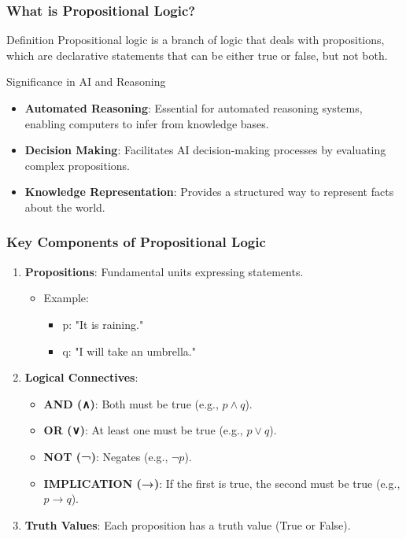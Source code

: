 \documentclass[aspectratio=169]{beamer}
\begin{document}
\begin{frame}[fragile]
    \frametitle{What is Propositional Logic?}
    \begin{block}{Definition}
        Propositional logic is a branch of logic that deals with propositions, which are declarative statements that can be either true or false, but not both.
    \end{block}

    \begin{block}{Significance in AI and Reasoning}
        \begin{itemize}
            \item \textbf{Automated Reasoning}: Essential for automated reasoning systems, enabling computers to infer from knowledge bases.
            \item \textbf{Decision Making}: Facilitates AI decision-making processes by evaluating complex propositions.
            \item \textbf{Knowledge Representation}: Provides a structured way to represent facts about the world.
        \end{itemize}
    \end{block}
\end{frame}

\begin{frame}[fragile]
    \frametitle{Key Components of Propositional Logic}
    \begin{enumerate}
        \item \textbf{Propositions}: Fundamental units expressing statements.
            \begin{itemize}
                \item Example: 
                    \begin{itemize}
                        \item p: "It is raining."
                        \item q: "I will take an umbrella."
                    \end{itemize}
            \end{itemize}
        \item \textbf{Logical Connectives}: 
            \begin{itemize}
                \item \textbf{AND (∧)}: Both must be true (e.g., \( p \land q \)).
                \item \textbf{OR (∨)}: At least one must be true (e.g., \( p \lor q \)).
                \item \textbf{NOT (¬)}: Negates (e.g., \( \neg p \)).
                \item \textbf{IMPLICATION (→)}: If the first is true, the second must be true (e.g., \( p \rightarrow q \)).
            \end{itemize}
        \item \textbf{Truth Values}: Each proposition has a truth value (True or False).
    \end{enumerate}
\end{frame}
\end{document}
